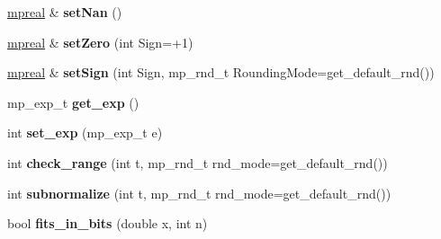 \begin{DoxyCompactItemize}
\item 
\mbox{\label{classmpfr_1_1mpreal_aa07b2786108643bfd8f1be7e8faeb934}} 
\hyperlink{classmpfr_1_1mpreal}{mpreal} \& {\bfseries set\+Nan} ()
\item 
\mbox{\label{classmpfr_1_1mpreal_ad646c7ac9716eaef4a8bf756f8b8cafb}} 
\hyperlink{classmpfr_1_1mpreal}{mpreal} \& {\bfseries set\+Zero} (int Sign=+1)
\item 
\mbox{\label{classmpfr_1_1mpreal_a9f0d537806565b188a0a5da0c11cabf9}} 
\hyperlink{classmpfr_1_1mpreal}{mpreal} \& {\bfseries set\+Sign} (int Sign, mp\+\_\+rnd\+\_\+t Rounding\+Mode=get\+\_\+default\+\_\+rnd())
\item 
\mbox{\label{classmpfr_1_1mpreal_a28ca7be1715bb0264f49df08050dae8a}} 
mp\+\_\+exp\+\_\+t {\bfseries get\+\_\+exp} ()
\item 
\mbox{\label{classmpfr_1_1mpreal_a6479b3d4adbffa32090235272bde717f}} 
int {\bfseries set\+\_\+exp} (mp\+\_\+exp\+\_\+t e)
\item 
\mbox{\label{classmpfr_1_1mpreal_aa26641b86f5da7ea4d6c2c152c4f0478}} 
int {\bfseries check\+\_\+range} (int t, mp\+\_\+rnd\+\_\+t rnd\+\_\+mode=get\+\_\+default\+\_\+rnd())
\item 
\mbox{\label{classmpfr_1_1mpreal_a3e1259ddd0b70e450f180416fcb6ebe4}} 
int {\bfseries subnormalize} (int t, mp\+\_\+rnd\+\_\+t rnd\+\_\+mode=get\+\_\+default\+\_\+rnd())
\item 
\mbox{\label{classmpfr_1_1mpreal_af2562b87b51837e39296db6c224ec034}} 
bool {\bfseries fits\+\_\+in\+\_\+bits} (double x, int n)
\end{DoxyCompactItemize}
